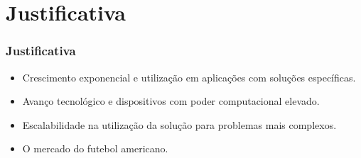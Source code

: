 \section{Justificativa}
\begin{frame}
\frametitle{Justificativa}

\begin{itemize}
\item Crescimento exponencial e utilização em aplicações com soluções específicas.

\item Avanço tecnológico e dispositivos com poder computacional elevado.
   
\item Escalabilidade na utilização da solução para problemas mais complexos.

\item O mercado do futebol americano.

\end{itemize}

\end{frame}